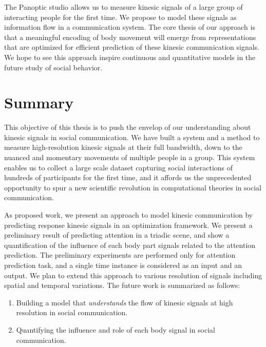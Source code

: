 \documentclass[a4paper,12pt,times,numbered,print,index]{Classes/PhDThesisPSnPDF}
\begin{document}
	The Panoptic studio allows us to measure kinesic signals of a large group of interacting people for the first time. We propose to model these signals as information flow in a communication system. The core thesis of our approach is that a meaningful encoding of body movement will emerge from representations that are optimized for efficient prediction of these kinesic communication signals. We hope to see this approach inspire continuous and quantitative models in the future study of social behavior. 
%	
%	
	
	
%	
	
	\chapter{Summary}
	
	This objective of this thesis is to push the envelop of our understanding about kinesic signals in social communication. We have built a system and a method to measure high-resolution kinesic signals at their full bandwidth, down to the nuanced and momentary movements of multiple people in a group. This system enables us to collect a large scale dataset capturing social interactions of hundreds of participants for the first time, and it affords us the unprecedented opportunity to spur a new scientific revolution in computational theories in social communication.
	
	As proposed work, we present an approach to model kinesic communication by predicting response kinesic signals in an optimization framework. We present a preliminary result of predicting attention in a triadic scene, and show a quantification of the influence of each body part signals related to the attention prediction. The preliminary experiments are performed only for attention prediction task, and a single time instance is considered as an input and an output. We plan to extend this approach to various resolution of signals including spatial and temporal variations. The future work is summarized as follows:
	
	\begin{enumerate}
		\item Building a model that \emph{understands} the flow of kinesic signals at high resolution in social communication. 
		\item Quantifying the influence and role of each body signal in social communication.
	\end{enumerate}
	
	
	
\end{document}
